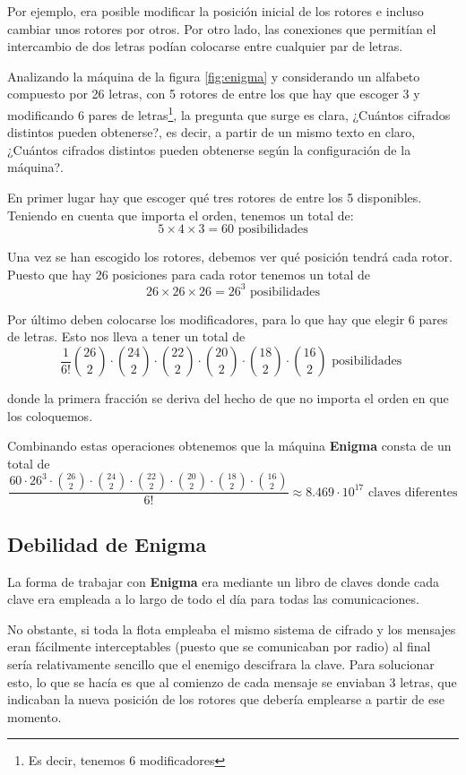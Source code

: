 \documentclass[nochap]{apuntesURJC}
\begin{document}
Por ejemplo, era posible modificar la posición inicial de los rotores e incluso cambiar unos rotores por otros. Por otro lado, las conexiones que permitían el intercambio de dos letras podían colocarse entre cualquier par de letras.

Analizando la máquina de la figura \ref{fig:enigma} y considerando un alfabeto compuesto por 26 letras, con 5 rotores de entre los que hay que escoger 3 y modificando 6 pares de letras\footnote{Es decir, tenemos 6 modificadores}, la pregunta que surge es clara, ¿Cuántos cifrados distintos pueden obtenerse?, es decir, a partir de un mismo texto en claro, ¿Cuántos cifrados distintos pueden obtenerse según la configuración de la máquina?.

En primer lugar hay que escoger qué tres rotores de entre los 5 disponibles. Teniendo en cuenta que importa el orden, tenemos un total de:
\[5 \times 4 \times 3 = 60 \text{ posibilidades}\]

Una vez se han escogido los rotores, debemos ver qué posición tendrá cada rotor. Puesto que hay 26 posiciones para cada rotor tenemos un total de
\[26\times 26 \times 26 = 26^3 \text{ posibilidades}\]

Por último deben colocarse los modificadores, para lo que hay que elegir 6 pares de letras. Esto nos lleva a tener un total de
\[\frac{1}{6!}{26 \choose 2} \cdot {24\choose 2}\cdot {22\choose 2}\cdot {20\choose 2}\cdot {18\choose 2}\cdot {16\choose 2} \text{ posibilidades }\]

donde la primera fracción se deriva del hecho de que no importa el orden en que los coloquemos.

Combinando estas operaciones obtenemos que la máquina \textbf{Enigma} consta de un total de
\[\frac{60\cdot 26^3 \cdot {26 \choose 2} \cdot {24\choose 2}\cdot {22\choose 2}\cdot {20\choose 2}\cdot {18\choose 2}\cdot {16\choose 2}}{6!}\approx 8.469 \cdot 10^{17}  \text{ claves diferentes}\]

\subsection{Debilidad de Enigma}
La forma de trabajar con \textbf{Enigma} era mediante un libro de claves donde cada clave era empleada a lo largo de todo el día para todas las comunicaciones.

No obstante, si toda la flota empleaba el mismo sistema de cifrado y los mensajes eran fácilmente interceptables (puesto que se comunicaban por radio) al final sería relativamente sencillo que el enemigo descifrara la clave. Para solucionar esto, lo que se hacía es que al comienzo de cada mensaje se enviaban 3 letras, que indicaban la nueva posición de los rotores que debería emplearse a partir de ese momento.
\end{document}
